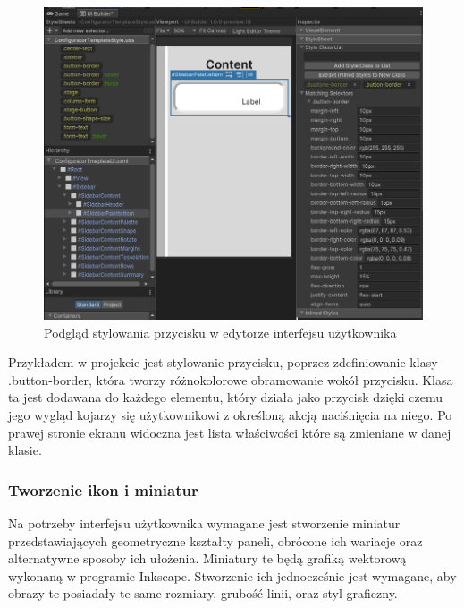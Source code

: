 \documentclass{article} %
\begin{document}
            \begin{figure}[h]
            \centering
            \includegraphics[bb=0 0 866 713,scale=0.4,keepaspectratio=true]{images/screenshots/work/6-tworzenie-ui_003.png}
            \caption{Podgląd stylowania przycisku w edytorze interfejsu użytkownika}
            \end{figure}


            Przykładem w projekcie jest stylowanie przycisku, poprzez zdefiniowanie klasy .button-border, która tworzy różnokolorowe obramowanie wokół przycisku. Klasa ta jest dodawana do każdego elementu, który działa jako przycisk dzięki czemu jego wygląd kojarzy się użytkownikowi z określoną akcją naciśnięcia na niego. Po prawej stronie ekranu widoczna jest lista właściwości które są zmieniane w danej klasie.
            \\
            
        \subsubsection*{Tworzenie ikon i miniatur}
            Na potrzeby interfejsu użytkownika wymagane jest stworzenie miniatur przedstawiających geometryczne kształty paneli, obrócone ich wariacje oraz alternatywne sposoby ich ułożenia. Miniatury te będą grafiką wektorową wykonaną w programie Inkscape. Stworzenie ich jednocześnie jest wymagane, aby obrazy te posiadały te same rozmiary, grubość linii, oraz styl graficzny.
            \\
\end{document}
